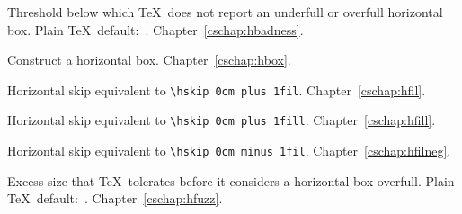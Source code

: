 \begin{glossinventory}
\item [\cs{hbadness}]
      Threshold below which \TeX\ does not report an underfull 
      or overfull  horizontal box.
      Plain \TeX\ default:~.
Chapter~\ref{cschap:hbadness}.

\item [\cs{hbox\gr{box specification}\lb\gr{horizontal material}\rb}]
      Construct a horizontal box. 
Chapter~\ref{cschap:hbox}.

\item [\cs{hfil}]
      Horizontal skip equivalent to \verb-\hskip 0cm plus 1fil-.
Chapter~\ref{cschap:hfil}.

\item [\cs{hfill}]
      Horizontal skip equivalent to \verb-\hskip 0cm plus 1fill-.
Chapter~\ref{cschap:hfill}.

\item [\cs{hfilneg}]
      Horizontal skip equivalent to \verb-\hskip 0cm minus 1fil-.
Chapter~\ref{cschap:hfilneg}.

\item [\cs{hfuzz}]
      Excess size that \TeX\ tolerates before it considers  
      a horizontal box overfull.
      Plain \TeX\ default:~\n{0.1pt}.
Chapter~\ref{cschap:hfuzz}.


\end{glossinventory}
